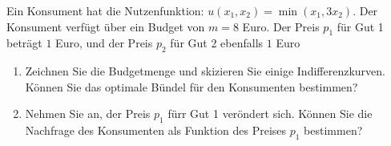 \begin{question}[subtitle={Perfekte Komplemente}]
	Ein Konsument hat die Nutzenfunktion: $u(x_1, x_2) = \min(x_1, 3x_2)$.
	Der Konsument verfügt über ein Budget von $m= 8$ Euro.
	Der Preis $p_1$ für Gut 1 beträgt $1$ Euro, und der Preis $p_2$ für Gut 2 ebenfalls $1$ Euro
	\begin{enumerate}
		\item Zeichnen Sie die Budgetmenge und skizieren Sie einige Indifferenzkurven. Können Sie das optimale
		      Bündel für den Konsumenten bestimmen?
		\item Nehmen Sie an, der Preis $p_1$ fürr Gut 1 veröndert sich. Können Sie die Nachfrage des Konsumenten
		      als Funktion des Preises $p_1$  bestimmen?
	\end{enumerate}
\end{question}

